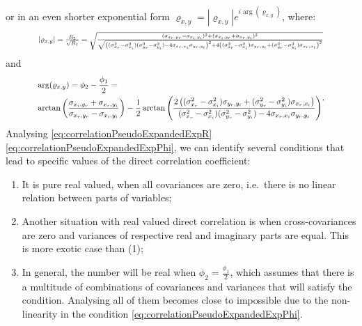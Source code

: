 \documentclass[
]{book}
\providecommand{\tightlist}{%
  \setlength{\itemsep}{0pt}\setlength{\parskip}{0pt}}
\begin{document}
or in an even shorter exponential form \({\varrho}_{x,y} = |{\varrho}_{x,y}| e ^{i \arg({\varrho}_{x,y})}\), where:
\begin{equation}
    \resizebox{0.85\textwidth}{!}{$
    |{\varrho}_{x,y}|= \frac{R_2}{\sqrt{R_1}} = \sqrt{\frac{(\sigma_{x_r, y_r} - \sigma_{x_i, y_i})^2 +  (\sigma_{x_i, y_r} + \sigma_{x_r, y_i})^2}{\sqrt{\left((\sigma_{x_r}^2 - \sigma_{x_i}^2)(\sigma_{y_r}^2 - \sigma_{y_i}^2) - 4 \sigma_{x_r,x_i} \sigma_{y_r,y_i} \right)^2+ 4 \left( (\sigma_{x_r}^2 - \sigma_{x_i}^2) \sigma_{y_r,y_i} + (\sigma_{y_r}^2 - \sigma_{y_i}^2) \sigma_{x_r,x_i} \right)^2}}}$}
    \label{eq:correlationPseudoExpandedExpR}
\end{equation}
and
\begin{equation}
    \resizebox{0.85\textwidth}{!}{$
    \begin{aligned}
    & \arg({\varrho}_{x,y}) = \phi_2 - \frac{\phi_1}{2} = \\
    & \arctan \left( \frac{\sigma_{x_i, y_r} + \sigma_{x_r, y_i}}{\sigma_{x_r, y_r} - \sigma_{x_i, y_i}} \right) - \frac{1}{2}\arctan \left(\frac{2 \left( (\sigma_{x_r}^2 - \sigma_{x_i}^2) \sigma_{y_r,y_i} + (\sigma_{y_r}^2 - \sigma_{y_i}^2) \sigma_{x_r,x_i} \right)}{(\sigma_{x_r}^2 - \sigma_{x_i}^2)(\sigma_{y_r}^2 - \sigma_{y_i}^2) - 4 \sigma_{x_r,x_i} \sigma_{y_r,y_i}}\right)
    \end{aligned}$}.
    \label{eq:correlationPseudoExpandedExpPhi}
\end{equation}
Analysing \eqref{eq:correlationPseudoExpandedExpR} \eqref{eq:correlationPseudoExpandedExpPhi}, we can identify several conditions that lead to specific values of the direct correlation coefficient:

\begin{enumerate}
\def\labelenumi{\arabic{enumi}.}
\tightlist
\item
  It is pure real valued, when all covariances are zero, i.e.~there is no linear relation between parts of variables;
\item
  Another situation with real valued direct correlation is when cross-covariances are zero and variances of respective real and imaginary parts are equal. This is more exotic case than (1);
\item
  In general, the number will be real when \(\phi_2 = \frac{\phi_1}{2}\), which assumes that there is a multitude of combinations of covariances and variances that will satisfy the condition. Analysing all of them becomes close to impossible due to the non-linearity in the condition \eqref{eq:correlationPseudoExpandedExpPhi}.
\end{enumerate}
\end{document}
